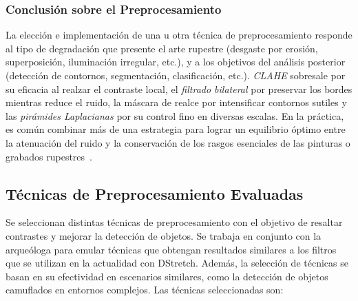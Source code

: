 \subsubsection*{Conclusión sobre el Preprocesamiento}

La elección e implementación de una u otra técnica de preprocesamiento responde al tipo de degradación que presente el arte rupestre (desgaste por erosión, superposición, iluminación irregular, etc.), y a los objetivos del análisis posterior (detección de contornos, segmentación, clasificación, etc.).
\textit{CLAHE} sobresale por su eficacia al realzar el contraste local, el \textit{filtrado bilateral} por preservar los bordes mientras reduce el ruido, la máscara de realce por intensificar contornos sutiles y las \textit{pirámides Laplacianas} por su control fino en diversas escalas.
En la práctica, es común combinar más de una estrategia para lograr un equilibrio óptimo entre la atenuación del ruido y la conservación de los rasgos esenciales de las pinturas o grabados rupestres~\cite{xiao2020,li2022}.

\subsection{Técnicas de Preprocesamiento Evaluadas}
\label{sec:preproc}
Se seleccionan distintas técnicas de preprocesamiento con el objetivo de resaltar contrastes y mejorar la detección de objetos.
Se trabaja en conjunto con la arqueóloga para emular técnicas que obtengan resultados similares a los filtros que se utilizan en la actualidad con DStretch.
Además, la selección de técnicas se basan en su efectividad en escenarios similares, como la detección de objetos camuflados en entornos complejos.
Las técnicas seleccionadas son:

